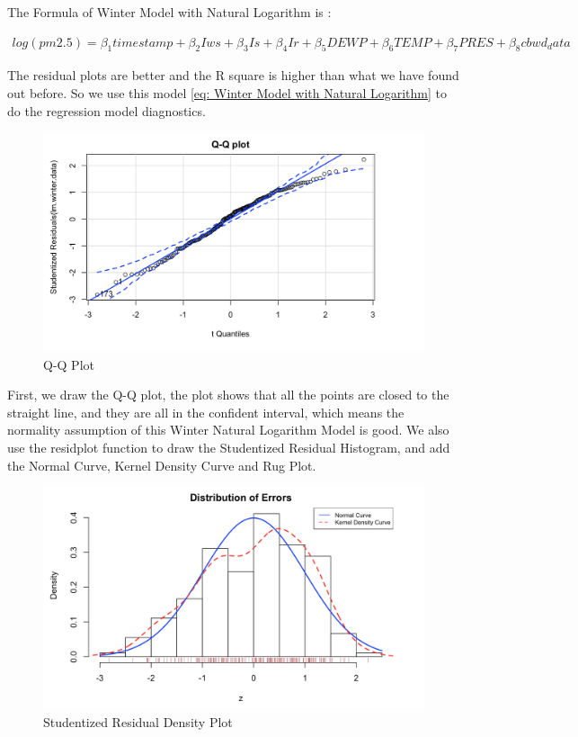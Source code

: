 The Formula of Winter Model with Natural Logarithm is :

\begin{align*}
  log(pm2.5)  = \beta_1 timestamp + \beta_2 Iws + \beta_3 Is + \beta_4 Ir + \beta_5 DEWP +
    \beta_6 TEMP + \beta_7 PRES + \beta_8 cbwd_data \label{eq: Winter Model with Natural Logarithm}
\end{align*}

 The residual plots are better and the R square is higher than what we have found out before.
So we use this model \ref{eq: Winter Model with Natural Logarithm} to do the regression model diagnostics.

\begin{figure}[H]
  \centering
  \includegraphics[width = 1.0\textwidth]{Figures/QQ.png}
  \caption[Figures/QQ.png]{Q-Q Plot}
  \label{fig: Q-Q Plot}
\end{figure}

First, we draw the Q-Q plot, the plot shows that all the points are closed to the straight line, and they are all in the confident interval, which means the normality assumption of this Winter Natural Logarithm Model is good.
We also use the residplot function to draw the Studentized Residual Histogram, and add the Normal Curve, Kernel Density Curve and Rug Plot.

\begin{figure}[H]
  \centering
  \includegraphics[width = 1.0\textwidth]{Figures/density.png}
  \caption[Figures/density.png]{Studentized Residual Density Plot}
  \label{fig: Studentized Residual Density Plot}
\end{figure}

